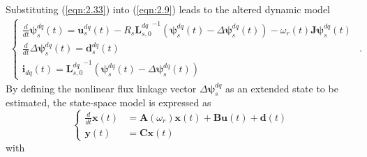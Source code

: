 Substituting (\ref{eqn:2.33}) into (\ref{eqn:2.9}) leads to the altered dynamic model
\begin{equation}
\begin{aligned}\label{eqn:2.35}
\begin{cases}
\frac{d}{dt}{\bm{\psi}}^{dq}_s(t) = \mathbf{u}^{dq}_s(t) - R_s {\mathbf{L}^{dq}_{s,0}}^{-1} \left( \bm{\psi}^{dq}_s(t) - \Delta{\boldsymbol{\psi}^{dq}_s}(t) \right) - \omega_r(t) \mathbf{J} \bm{\psi}^{dq}_s(t) \\
\frac{d}{dt}{\Delta}{\boldsymbol{\psi}^{dq}_s}(t) = \mathbf{d}^{dq}_s(t) \\
\mathbf{i}_{dq}(t) = {\mathbf{L}^{dq}_{s,0}}^{-1} \left( \bm{\psi}^{dq}_s(t) - \Delta{\boldsymbol{\psi}^{dq}_s}(t) \right)
\end{cases}
\end{aligned}.
\end{equation}
By defining the nonlinear flux linkage vector $\Delta{\boldsymbol{\psi}^{dq}_s}$ as an extended state to be estimated, the state-space model is expressed as
\begin{equation}\label{eqn:2.36}
\left\{
\begin{aligned}
\frac{d}{dt}\mathbf{x}(t) &= \mathbf{A}(\omega_r)\mathbf{x}(t) + \mathbf{B}\mathbf{u}(t) + \mathbf{d}(t) \\
\mathbf{y}(t) &= \mathbf{C}\mathbf{x}(t)
\end{aligned}
\right.
\end{equation}
with 
